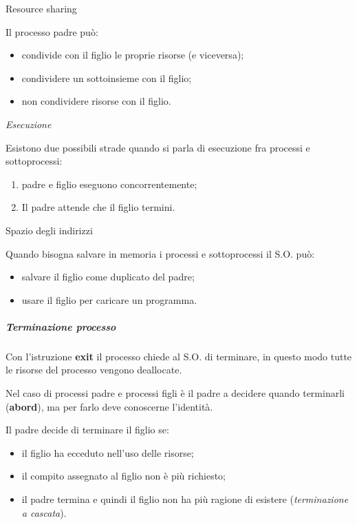 Resource sharing

Il processo padre può:

\begin{itemize}
\item
  condivide con il figlio le proprie risorse (e viceversa);
\item
  condividere un sottoinsieme con il figlio;
\item
  non condividere risorse con il figlio.
\end{itemize}

\emph{Esecuzione}

Esistono due possibili strade quando si parla di esecuzione fra processi
e sottoprocessi:

\begin{enumerate}
\def\labelenumi{\arabic{enumi}.}
\item
  padre e figlio eseguono concorrentemente;
\item
  Il padre attende che il figlio termini.
\end{enumerate}

Spazio degli indirizzi

Quando bisogna salvare in memoria i processi e sottoprocessi il S.O.
può:

\begin{itemize}
\item
  salvare il figlio come duplicato del padre;
\item
  usare il figlio per caricare un programma.
\end{itemize}

\subparagraph{\texorpdfstring{\emph{Terminazione
processo}}{Terminazione processo}}\label{terminazione-processo}

Con l'istruzione \textbf{exit} il processo chiede al S.O. di terminare,
in questo modo tutte le risorse del processo vengono deallocate.

Nel caso di processi padre e processi figli è il padre a decidere quando
terminarli (\textbf{abord}), ma per farlo deve conoscerne l'identità.

Il padre decide di terminare il figlio se:

\begin{itemize}
\item
  il figlio ha ecceduto nell'uso delle risorse;
\item
  il compito assegnato al figlio non è più richiesto;
\item
  il padre termina e quindi il figlio non ha più ragione di esistere
  (\emph{terminazione a cascata}).
\end{itemize}

